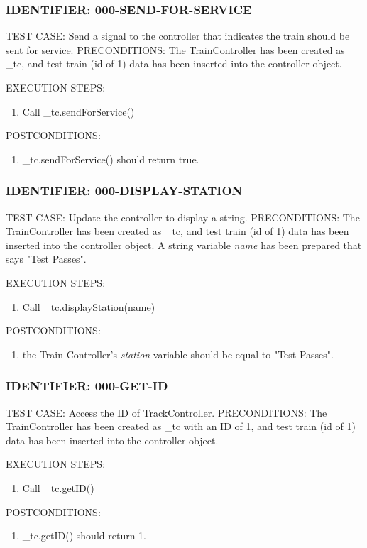 \documentclass{scrreprt}
\begin{document}
\subsubsection{IDENTIFIER: 000-SEND-FOR-SERVICE}
TEST CASE: Send a signal to the controller that indicates the train should be sent for service.
PRECONDITIONS: The TrainController has been created as _tc, and test train (id of 1) data has been inserted into the controller object.

EXECUTION STEPS:
\begin{enumerate}
	\item Call _tc.sendForService()
\end{enumerate}
POSTCONDITIONS:
\begin{enumerate}
	\item _tc.sendForService() should return true.
\end{enumerate}

\subsubsection{IDENTIFIER: 000-DISPLAY-STATION}
TEST CASE: Update the controller to display a string.
PRECONDITIONS: The TrainController has been created as _tc, and test train (id of 1) data has been inserted into the controller object. A string variable \textit{name} has been prepared that says "Test Passes".

EXECUTION STEPS:
\begin{enumerate}
	\item Call _tc.displayStation(name)
\end{enumerate}
POSTCONDITIONS:
\begin{enumerate}
	\item the Train Controller's \textit{station} variable should be equal to "Test Passes".
\end{enumerate}

\subsubsection{IDENTIFIER: 000-GET-ID}
TEST CASE: Access the ID of TrackController.
PRECONDITIONS: The TrainController has been created as _tc with an ID of 1, and test train (id of 1) data has been inserted into the controller object.

EXECUTION STEPS:
\begin{enumerate}
	\item Call _tc.getID()
\end{enumerate}
POSTCONDITIONS:
\begin{enumerate}
	\item _tc.getID() should return 1.
\end{enumerate}
\end{document}
